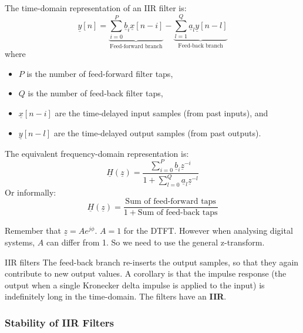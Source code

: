 \begin{refsection}
The time-domain representation of an \ac{IIR} filter is:
\begin{equation}
	\underline{y}[n] = \underbrace{\sum\limits_{i=0}^{P} \underline{b}_i \underline{x}[n-i]}_{\text{Feed-forward branch}} - \underbrace{\sum\limits_{l=1}^{Q} \underline{a}_l \underline{y}[n-l]}_{\text{Feed-back branch}}
\end{equation}
where
\begin{itemize}
	\item $P$ is the number of feed-forward filter taps,
	\item $Q$ is the number of feed-back filter taps,
	\item $\underline{x}[n-i]$ are the time-delayed input samples (from past inputs), and
	\item $\underline{y}[n-l]$ are the time-delayed output samples (from past outputs).
\end{itemize}

The equivalent frequency-domain representation is:
\begin{equation}
	\underline{H}(\underline{z}) = \frac{\sum\limits_{i=0}^{P} \underline{b}_i \underline{z}^{-i}}{1 + \sum\limits_{l=0}^{Q} \underline{a}_l \underline{z}^{-l}}
\end{equation}
Or informally:
\begin{equation}
	\underline{H}(\underline{z}) = \frac{\text{Sum of feed-forward taps}}{1 + \text{Sum of feed-back taps}}
\end{equation}

\begin{remark}
	Remember that $\underline{z} = A e^{j \phi}$. $A = 1$ for the \ac{DTFT}. However when analysing digital systems, $A$ can differ from 1. So we need to use the general z-transform.
\end{remark}

\begin{definition}{\ac{IIR} filters}
	The feed-back branch re-inserts the output samples, so that they again contribute to new output values.	A corollary is that the impulse response (the output when a single Kronecker delta impulse is applied to the input) is indefinitely long in the time-domain. The filters have an \textbf{\acf{IIR}}.
\end{definition}

\subsubsection{Stability of IIR Filters}


\end{refsection}
